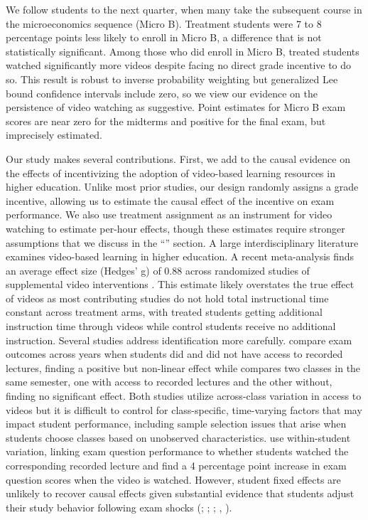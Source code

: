 We follow students to the next quarter, when many take the subsequent course in the microeconomics sequence (Micro B).
Treatment students were 7 to 8 percentage points less likely to enroll in Micro B, a difference that is not statistically significant.
Among those who did enroll in Micro B, treated students watched significantly more videos despite facing no direct grade incentive to do so.
This result is robust to inverse probability weighting but generalized Lee bound confidence intervals include zero, so we view our evidence on the persistence of video watching as suggestive.
Point estimates for Micro B exam scores are near zero for the midterms and positive for the final exam, but imprecisely estimated.

Our study makes several contributions.
First, we add to the causal evidence on the effects of incentivizing the adoption of video-based learning resources in higher education.
Unlike most prior studies, our design randomly assigns a grade incentive, allowing us to estimate the causal effect of the incentive on exam performance.
We also use treatment assignment as an instrument for video watching to estimate per-hour effects, though these estimates require stronger assumptions that we discuss in the ``'' section.
A large interdisciplinary literature examines video-based learning in higher education.
A recent meta-analysis finds an average effect size (Hedges' g) of 0.88 across randomized studies of supplemental video interventions \parencite{noetel2021}.
This estimate likely overstates the true effect of videos as most contributing studies do not hold total instructional time constant across treatment arms, with treated students getting additional instruction time through videos while control students receive no additional instruction.
Several studies address identification more carefully.
\textcite{fs2007} compare exam outcomes across years when students did and did not have access to recorded lectures, finding a positive but non-linear effect while \textcite{savage2009} compares two classes in the same semester, one with access to recorded lectures and the other without, finding no significant effect.
Both studies utilize across-class variation in access to videos but it is difficult to control for class-specific, time-varying factors that may impact student performance, including sample selection issues that arise when students choose classes based on unobserved characteristics.
\textcite{cl2012} use within-student variation, linking exam question performance to whether students watched the corresponding recorded lecture and find a 4 percentage point increase in exam question scores when the video is watched.
However, student fixed effects are unlikely to recover causal effects given substantial evidence that students adjust their study behavior following exam shocks (\cite{oettinger2002}; \cite{ko2005}; \cite{ss2008}; \citeauthor{bo2012} \citeyear{bo2012}, \citeyear{bo2015}).

